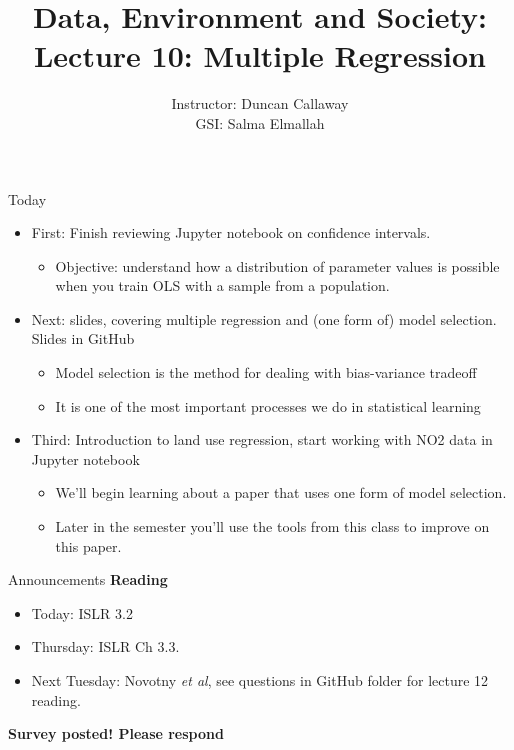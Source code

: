 \documentclass[aspectratio=169]{beamer}
\title[Lecture 10: Multiple Regression] %
{Data, Environment and Society: \\{Lecture 10: Multiple Regression}}
\author[ER131: Data, Environment and Society] 
{Instructor: Duncan Callaway\\
GSI: Salma Elmallah}
\institute[UC Berkeley] %
 {\small{ \bf October 1, 2019}}
\date[October 1, 2019]
\begin{document}
\begin{frame}
  \titlepage
\end{frame}

\begin{frame}{Today}

\begin{itemize}
\item First: Finish reviewing Jupyter notebook on confidence intervals.
\begin{itemize}
  \item Objective: understand how a distribution of parameter values is possible when you train OLS with a sample from a population.  
\end{itemize}
\item Next: slides, covering multiple regression and (one form of) model selection.  Slides in GitHub
\begin{itemize}
  \item Model selection is the method for dealing with bias-variance tradeoff
  \item It is one of the most important processes we do in statistical learning  
\end{itemize}
\item Third: Introduction to land use regression, start working with NO2 data in Jupyter notebook
\begin{itemize}
  \item We'll begin learning about a paper that uses one form of model selection.
  \item Later in the semester you'll use the tools from this class to improve on this paper.
\end{itemize}
\end{itemize}

\end{frame}

\begin{frame}{Announcements}
\textbf{Reading}
\begin{itemize}
\item Today: ISLR 3.2
\item Thursday: ISLR Ch 3.3.
\item Next Tuesday: Novotny \textit{et al}, see questions in GitHub folder for lecture 12 reading.
\end{itemize}

\textbf{Survey posted!  Please respond}
\end{frame}
\end{document}
